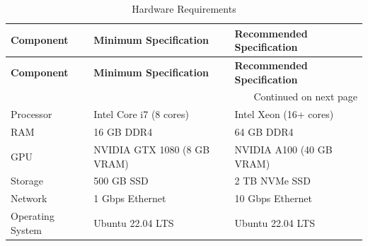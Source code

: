 \begin{longtable}{|p{3.6cm}|p{5.5cm}|p{4.2cm}|}
\caption{Hardware Requirements}
\label{tab:hardware_requirements}\\

\hline
\textbf{Component} &
\textbf{Minimum Specification} &
\textbf{Recommended Specification} \\
\hline
\endfirsthead

\hline
\textbf{Component} &
\textbf{Minimum Specification} &
\textbf{Recommended Specification} \\
\hline
\endhead

\hline
\multicolumn{3}{r}{Continued on next page} \\
\endfoot

\hline
\endlastfoot


Processor &
Intel Core i7 (8 cores) &
Intel Xeon (16+ cores) \\
\hline

RAM &
16 GB DDR4 &
64 GB DDR4 \\
\hline

GPU &
NVIDIA GTX 1080 (8 GB VRAM) &
NVIDIA A100 (40 GB VRAM) \\
\hline

Storage &
500 GB SSD &
2 TB NVMe SSD \\
\hline

Network &
1 Gbps Ethernet &
10 Gbps Ethernet \\
\hline

Operating System &
Ubuntu 22.04 LTS &
Ubuntu 22.04 LTS \\
\hline

\end{longtable}

